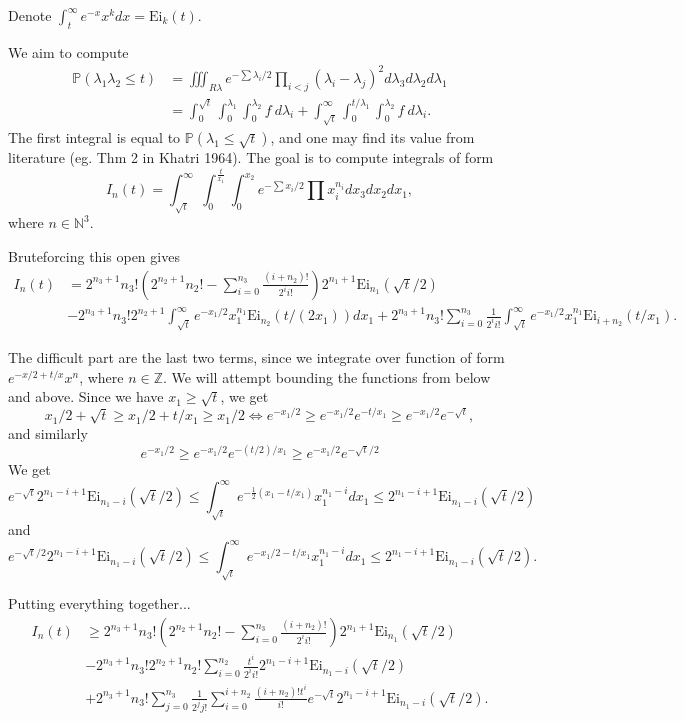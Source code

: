 \documentclass[12pt]{article}
\def\P{\mathbb{P}}
\def\Z{\mathbb{Z}}
\def\N{\mathbb{N}}
\def\Ei{\mathrm{Ei}}
\begin{document}
Denote $\int_t^\infty e^{-x} x^k dx = \Ei_k(t)$.

We aim to compute
\begin{align*}
    \P(\lambda_1\lambda_2 \leq t) &= \iiint_{R\lambda} e^{-\sum \lambda_i/2} \prod_{i < j} (\lambda_i - \lambda_j)^2 d\lambda_3 d\lambda_2 d\lambda_1 \\
    &=  \int_0^{\sqrt{t}} \int_0^{\lambda_1} \int_0^{\lambda_2} f ~d\lambda_i + \int_{\sqrt{t}}^\infty \int_0^{t/\lambda_1} \int_0^{\lambda_2} f ~d\lambda_i.
\end{align*}
The first integral is equal to $\P(\lambda_1 \leq \sqrt{t})$, and one may find its value from literature (eg. Thm 2 in Khatri 1964).
The goal is to compute integrals of form
\[ I_n(t) = \int_{\sqrt{t}}^\infty \int_0^{\frac{t}{x_1}} \int_0^{x_2} e^{-\sum x_i/2} \prod x_i^{n_i} dx_3 dx_2 dx_1, \]
where $n \in \N^3$.

Bruteforcing this open gives
\begin{align*}
    I_n(t) &= 2^{n_3 + 1} n_3! \left( 2^{n_2+1} n_2! - \sum_{i=0}^{n_3} \frac{(i+n_2)!}{2^i i!}\right) 2^{n_1 + 1} \Ei_{n_1}(\sqrt{t}/2) \\
    &-  2^{n_3 + 1} n_3! 2^{n_2+1} \int_{\sqrt{t}}^\infty e^{-x_1/2} x_1^{n_1} \Ei_{n_2}(t/(2x_1)) dx_1 + 2^{n_3 + 1} n_3!\sum_{i=0}^{n_3} \frac{1}{2^i i!}  \int_{\sqrt{t}}^\infty e^{-x_1/2} x_1^{n_1}  \Ei_{i+n_2}(t/x_1).
\end{align*}

The difficult part are the last two terms, since we integrate over function of form $e^{-x/2 + t/x} x^n$, where $n \in \Z$.
We will attempt bounding the functions from below and above. Since we have $x_1 \geq \sqrt{t}$, we get
\[  x_1/2 + \sqrt{t}  \geq x_1/2 + t/x_1 \geq x_1/2 \Leftrightarrow e^{-x_1/2} \geq e^{-x_1/2} e^{-t/x_1} \geq e^{-x_1/2}e^{-\sqrt{t}}, \]
and similarly
\[  e^{-x_1/2} \geq e^{-x_1/2} e^{-(t/2)/x_1} \geq e^{-x_1/2}e^{-\sqrt{t}/2} \]
We get 
\[ e^{-\sqrt{t}} 2^{n_1-i+1}\Ei_{n_1-i}(\sqrt{t}/2) \leq \int_{\sqrt{t}}^\infty e^{-\frac{1}{2}(x_1-t/x_1)} x_1^{n_1-i} dx_1 \leq 2^{n_1-i+1}\Ei_{n_1-i}(\sqrt{t}/2) \]
and
\[ e^{-\sqrt{t}/2} 2^{n_1-i+1}\Ei_{n_1-i}(\sqrt{t}/2) \leq \int_{\sqrt{t}}^\infty e^{-x_1/2 - t/x_1} x_1^{n_1-i} dx_1 \leq 2^{n_1-i+1}\Ei_{n_1-i}(\sqrt{t}/2).  \]

Putting everything together...
\begin{align*}
    I_{n}(t) &\geq 2^{n_3 + 1} n_3! \left( 2^{n_2+1} n_2! - \sum_{i=0}^{n_3} \frac{(i+n_2)!}{2^i i!}\right) 2^{n_1 + 1} \Ei_{n_1}(\sqrt{t}/2) \\
    &-  2^{n_3 + 1} n_3! 2^{n_2+1}  n_2!  \sum_{i=0}^{n_2} \frac{t^i}{2^i i!} 2^{n_1-i+1}\Ei_{n_1-i}(\sqrt{t}/2) \\
    &+ 2^{n_3 + 1} n_3!\sum_{j=0}^{n_3} \frac{1}{2^jj!} \sum_{i=0}^{i+n_2}  \frac{(i+n_2)!t^i}{i!} e^{-\sqrt{t}} 2^{n_1-i+1}\Ei_{n_1-i}(\sqrt{t}/2).
\end{align*}
\end{document}
